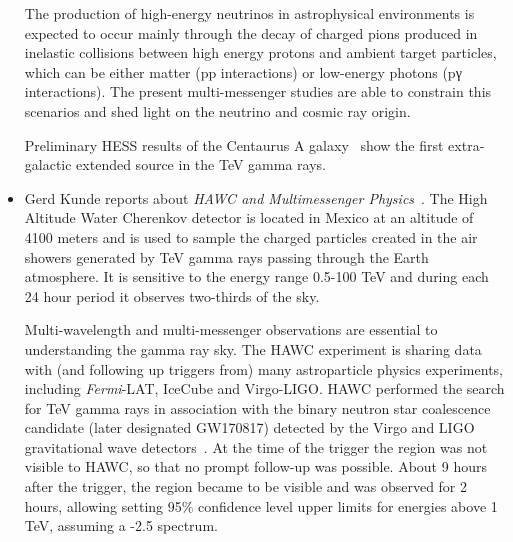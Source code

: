 \documentclass{PoS}
\begin{document}
\begin{itemize}
The production of high-energy neutrinos in astrophysical environments is expected to occur mainly through the decay of charged pions produced in inelastic collisions between high energy protons and ambient target particles, which can be either matter (pp interactions) or low-energy photons (pγ interactions). The present multi-messenger studies are able to constrain this scenarios and shed light on the neutrino and cosmic ray origin. 


Preliminary HESS results of the Centaurus A galaxy~\cite{Taylor}  show the first extra-galactic extended source in the TeV gamma rays.

\item Gerd Kunde reports about {\it HAWC and Multimessenger Physics}~\cite{Kunde}. 
The High Altitude Water Cherenkov detector is
located in Mexico at an altitude of 4100 meters and
is used to sample the charged particles created in the air showers generated by TeV gamma rays passing through the Earth atmosphere. It is sensitive to the energy range 0.5-100 TeV and
during each 24 hour period it observes two-thirds of the sky. 

Multi-wavelength and multi-messenger observations are 
essential to understanding the gamma ray sky. The HAWC 
experiment is sharing data with (and following up triggers from) many astroparticle physics experiments, including \textit{Fermi}-LAT, IceCube and Virgo-LIGO. 
HAWC performed the search for TeV gamma rays in association with the binary neutron star coalescence candidate (later designated GW170817) detected by the Virgo and LIGO gravitational wave detectors~\cite{TheMMpaper}. At the time of the trigger the region was not visible to HAWC, so that no prompt follow-up was possible. About 9 hours after the trigger, the region became to be visible and was observed for 2 hours, allowing setting 95$\%$ confidence level upper limits for energies above 1 TeV, assuming a -2.5 spectrum. 


\end{itemize}
\end{document}
